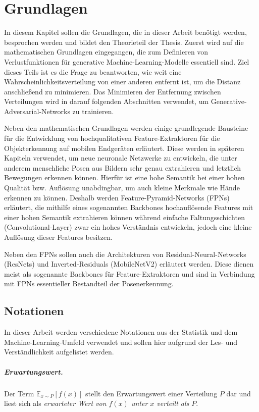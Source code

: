 \chapter{Grundlagen}\label{chapter:basics}
In diesem Kapitel sollen die Grundlagen, die in dieser Arbeit benötigt werden, besprochen werden und bildet den Theorieteil der Thesis. Zuerst wird auf die mathematischen Grundlagen eingegangen, die zum Definieren von Verlustfunktionen für generative Machine-Learning-Modelle essentiell sind. Ziel dieses Teils ist es die Frage zu beantworten, wie weit eine Wahrscheinlichkeitsverteilung von einer anderen entfernt ist, um die Distanz anschließend zu minimieren. Das Minimieren der Entfernung zwischen Verteilungen wird in darauf folgenden Abschnitten verwendet, um Generative-Adversarial-Networks zu trainieren.

Neben den mathematischen Grundlagen werden einige grundlegende Bausteine für die
Entwicklung von hochqualitativen Feature-Extraktoren für die Objekterkennung auf
mobilen Endgeräten erläutert. Diese werden in späteren Kapiteln verwendet, um
neue neuronale Netzwerke zu entwickeln, die unter anderem menschliche Posen aus
Bildern sehr genau extrahieren und letztlich Bewegungen erkennen können. Hierfür
ist eine hohe Semantik bei einer hohen Qualität bzw. Auflösung unabdingbar, um
auch kleine Merkmale wie Hände erkennen zu können. Deshalb werden
Feature-Pyramid-Networks (FPNs) erläutert, die mithilfe eines sogenannten
Backbones hochauflösende Features mit einer hohen Semantik extrahieren können
während einfache Faltungsschichten (Convolutional-Layer) zwar ein hohes
Verständnis entwickeln, jedoch eine kleine Auflösung dieser Features besitzen.

Neben den FPNs sollen auch die Architekturen von Residual-Neural-Networks (ResNets) und Inverted-Residuals (MobileNetV2) erläutert werden. Diese dienen meist als sogenannte Backbones für Feature-Extraktoren und sind in Verbindung mit FPNs essentieller Bestandteil der Posenerkennung.

\section{Notationen}
In dieser Arbeit werden verschiedene Notationen aus der Statistik und dem
Machine-Learning-Umfeld verwendet und sollen hier aufgrund der Les- und
Verständlichkeit aufgelistet werden.

\paragraph{Erwartungswert.}
Der Term $\mathbb{E}_{x \sim P}\left[f(x)\right]$ stellt den Erwartungswert
einer Verteilung $P$ dar und liest sich als \textit{erwarteter Wert von
$f(x)$ unter $x$ verteilt als $P$}.

